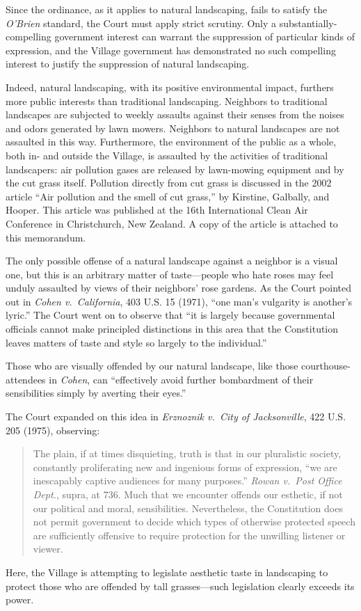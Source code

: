 \documentclass[12pt]{article}
\begin{document}
Since the ordinance, as it applies to natural landscaping, fails to satisfy the {\em O'Brien} standard, the Court must apply strict scrutiny.
Only a substantially-compelling government interest can warrant the suppression of particular kinds of expression, and the Village government has demonstrated no such compelling interest to justify the suppression of natural landscaping.

Indeed, natural landscaping, with its positive environmental impact, furthers more public interests than traditional landscaping.
Neighbors to traditional landscapes are subjected to weekly assaults against their senses from the noises and odors generated by lawn mowers.
Neighbors to natural landscapes are not assaulted in this way.
Furthermore, the environment of the public as a whole, both in- and outside the Village, is assaulted by the activities of traditional landscapers:  air pollution gases are released by lawn-mowing equipment and by the cut grass itself.
Pollution directly from cut grass is discussed in the 2002 article ``Air pollution and the smell of cut grass,'' by Kirstine, Galbally, and Hooper.
This article was published at the 16th International Clean Air Conference in Christchurch, New Zealand.
A copy of the article is attached to this memorandum.

The only possible offense of a natural landscape against a neighbor is a visual one, but this is an arbitrary matter of taste---people who hate roses may feel unduly assaulted by views of their neighbors' rose gardens.
As the Court pointed out in  {\em Cohen v.\ California}, 403 U.S. 15 (1971), ``one man's vulgarity is another's lyric.''
The Court went on to observe that ``it is largely because governmental officials cannot make principled distinctions in this area that the Constitution leaves matters of taste and style so largely to the individual.''

Those who are visually offended by our natural landscape, like those courthouse-attendees in {\em Cohen}, can ``effectively avoid further bombardment of their sensibilities simply by averting their eyes.''

The Court expanded on this idea in  {\em Erznoznik v.\ City of Jacksonville}, 422 U.S. 205 (1975), observing: 
\begin{quote}
The plain, if at times disquieting, truth is that in our pluralistic society, constantly proliferating new and ingenious forms of expression, ``we are inescapably captive audiences for many purposes.'' {\em Rowan v.\ Post Office Dept.}, supra, at 736. Much that we encounter offends our esthetic, if not our political and moral, sensibilities. Nevertheless, the Constitution does not permit government to decide which types of otherwise protected speech are sufficiently offensive to require protection for the unwilling listener or viewer.
\end{quote}
Here, the Village is attempting to legislate aesthetic taste in landscaping to protect those who are offended by tall grasses---such legislation clearly exceeds its power. 
\end{document}

